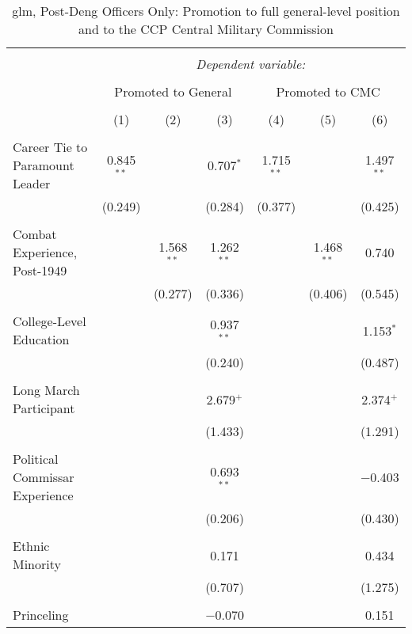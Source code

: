 
\begin{table}[!htbp] \centering 
  \caption{glm, Post-Deng Officers Only: Promotion to full general-level position and to the CCP Central Military Commission} 
  \label{table_a11} 
\begin{tabular}{@{\extracolsep{5pt}}lcccccc} 
\\[-1.8ex]\hline 
\hline \\[-1.8ex] 
 & \multicolumn{6}{c}{\textit{Dependent variable:}} \\ 
\cline{2-7} 
\\[-1.8ex] & \multicolumn{3}{c}{Promoted to General} & \multicolumn{3}{c}{Promoted to CMC} \\ 
\\[-1.8ex] & (1) & (2) & (3) & (4) & (5) & (6)\\ 
\hline \\[-1.8ex] 
 Career Tie to Paramount Leader & 0.845$^{**}$ &  & 0.707$^{*}$ & 1.715$^{**}$ &  & 1.497$^{**}$ \\ 
  & (0.249) &  & (0.284) & (0.377) &  & (0.425) \\ 
  & & & & & & \\ 
 Combat Experience, Post-1949 &  & 1.568$^{**}$ & 1.262$^{**}$ &  & 1.468$^{**}$ & 0.740 \\ 
  &  & (0.277) & (0.336) &  & (0.406) & (0.545) \\ 
  & & & & & & \\ 
 College-Level Education &  &  & 0.937$^{**}$ &  &  & 1.153$^{*}$ \\ 
  &  &  & (0.240) &  &  & (0.487) \\ 
  & & & & & & \\ 
 Long March Participant &  &  & 2.679$^{+}$ &  &  & 2.374$^{+}$ \\ 
  &  &  & (1.433) &  &  & (1.291) \\ 
  & & & & & & \\ 
 Political Commissar Experience &  &  & 0.693$^{**}$ &  &  & $-$0.403 \\ 
  &  &  & (0.206) &  &  & (0.430) \\ 
  & & & & & & \\ 
 Ethnic Minority &  &  & 0.171 &  &  & 0.434 \\ 
  &  &  & (0.707) &  &  & (1.275) \\ 
  & & & & & & \\ 
 Princeling &  &  & $-$0.070 &  &  & 0.151 \\ 

\end{tabular}
\end{table}
